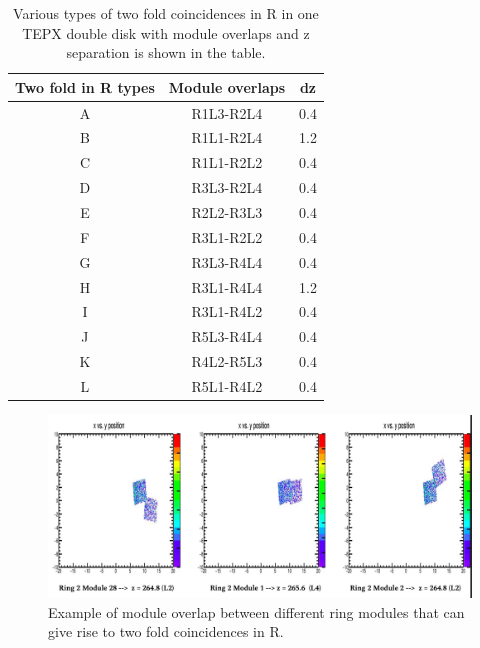 \begin{table}[htbp]
\centering
\caption{Various types of two fold coincidences in R in one TEPX double disk with module overlaps and z separation is shown in the table.}
\label{tab:module_connections}
\begin{tabular}{ccc}
\textbf{Two fold in R types} & \textbf{Module overlaps} & \textbf{dz} \\ \hline
A & R1L3-R2L4 & 0.4 \\
B & R1L1-R2L4 & 1.2 \\
C & R1L1-R2L2 & 0.4 \\
D & R3L3-R2L4 & 0.4 \\
E & R2L2-R3L3 & 0.4 \\
F & R3L1-R2L2 & 0.4 \\
G & R3L3-R4L4 & 0.4 \\
H & R3L1-R4L4 & 1.2 \\
I & R3L1-R4L2 & 0.4 \\
J & R5L3-R4L4 & 0.4 \\
K & R4L2-R5L3 & 0.4 \\
L & R5L1-R4L2 & 0.4 \\ 
\end{tabular}
\end{table}


\begin{figure}[!htp]
\centering
\includegraphics[width=1\textwidth]{ashish_thesis/moduleoverlapinR_1.png}
\caption{%
  Example of module overlap between different ring modules that can give rise to two fold coincidences in R.
}
\label{fig:cluster_ring}
\end{figure}




